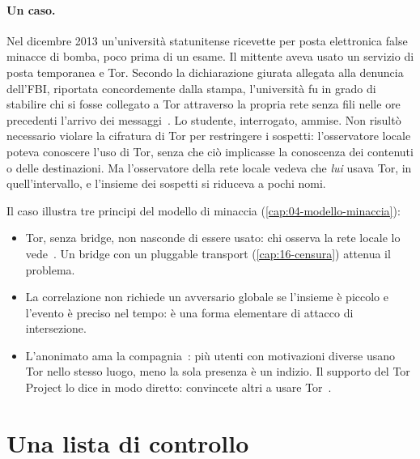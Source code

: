 \paragraph{Un caso.} Nel dicembre 2013 un'università statunitense ricevette per posta elettronica false minacce di bomba, poco prima di un esame. Il mittente aveva usato un servizio di posta temporanea e Tor. Secondo la dichiarazione giurata allegata alla denuncia dell'FBI, riportata concordemente dalla stampa, l'università fu in grado di stabilire chi si fosse collegato a Tor attraverso la propria rete senza fili nelle ore precedenti l'arrivo dei messaggi~\cite{wbur2013harvard,sandvik2013harvard}. Lo studente, interrogato, ammise. Non risultò necessario violare la cifratura di Tor per restringere i sospetti: l'osservatore locale poteva conoscere l'uso di Tor, senza che ciò implicasse la conoscenza dei contenuti o delle destinazioni. Ma l'osservatore della rete locale vedeva che \emph{lui} usava Tor, in quell'intervallo, e l'insieme dei sospetti si riduceva a pochi nomi.

Il caso illustra tre principi del modello di minaccia (\cref{cap:04-modello-minaccia}):
\begin{itemize}
  \item Tor, senza bridge, non nasconde di essere usato: chi osserva la rete locale lo vede~\cite{tailswarnings}. Un bridge con un pluggable transport (\cref{cap:16-censura}) attenua il problema.
  \item La correlazione non richiede un avversario globale se l'insieme è piccolo e l'evento è preciso nel tempo: è una forma elementare di attacco di intersezione.
  \item L'anonimato ama la compagnia~\cite{dingledine2006company}: più utenti con motivazioni diverse usano Tor nello stesso luogo, meno la sola presenza è un indizio. Il supporto del Tor Project lo dice in modo diretto: convincete altri a usare Tor~\cite{torsafety}.
\end{itemize}

\section{Una lista di controllo}\label{sec:opsec-lista}

